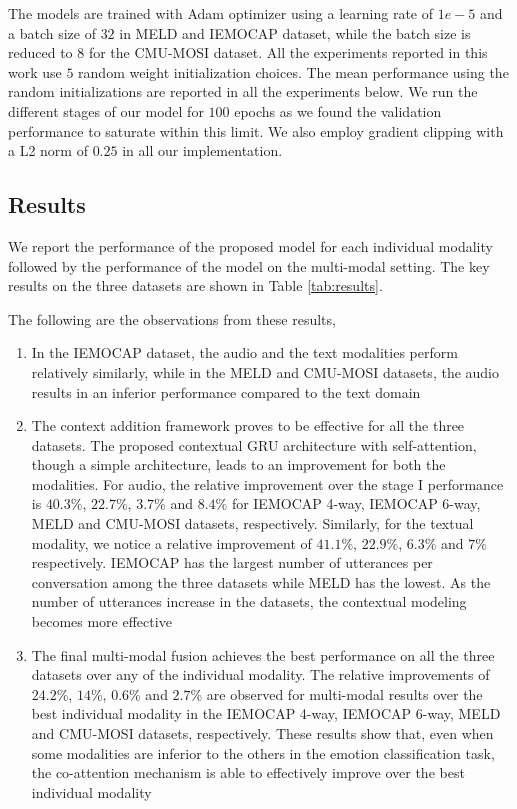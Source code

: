 \documentclass[lettersize,journal]{IEEEtran}
\begin{document}
The models are trained with Adam optimizer using a learning rate of $1e-5$ and a batch size of $32$ in MELD and IEMOCAP dataset, while the batch size is reduced to $8$ for the CMU-MOSI dataset. All the experiments reported in this work use $5$ random weight initialization choices. The mean performance using the random initializations are reported in all the experiments below. We run the different stages of our model for $100$ epochs as we found the validation performance to saturate within this limit. We also employ gradient clipping with a L2 norm of $0.25$ in all our implementation.

\subsection{Results}
We report the performance of the proposed model for each individual modality followed by the performance of the model on the multi-modal setting.  The key results on the three datasets are shown in Table \ref{tab:results}. 

The following are the observations from these results, 
\begin{enumerate}[label=(\roman*)] 
    \item In the IEMOCAP dataset, the audio and the text modalities perform relatively similarly, while in the MELD and CMU-MOSI datasets, the audio results in an inferior performance compared to the text domain
\item The context addition framework proves to be effective for all the three datasets. The proposed contextual GRU architecture with self-attention, though a simple architecture, leads to an improvement for both the modalities. For audio, the relative improvement over the stage I performance is $40.3\%$, $22.7\%$, $3.7\%$ and $8.4\%$ for IEMOCAP 4-way, IEMOCAP 6-way, MELD and CMU-MOSI datasets, respectively. Similarly, for the textual modality, we notice a relative improvement of $41.1\%$, $22.9\%$, $6.3\%$ and $7\%$ respectively. IEMOCAP has the largest number of utterances per conversation among the three datasets while MELD has the lowest. As the number of utterances increase in the datasets, the contextual modeling becomes more effective
    \item The final multi-modal fusion achieves the best performance on all the three datasets over any of the individual modality. The relative improvements of $24.2$\%, $14$\%, $0.6$\% and $2.7$\% are observed for multi-modal results over the best individual modality in the IEMOCAP 4-way, IEMOCAP 6-way, MELD and CMU-MOSI datasets, respectively. These results show that, even when some modalities are inferior to the others in the emotion classification task, the co-attention mechanism is able to effectively improve over the best individual modality
\end{enumerate}
\end{document}
